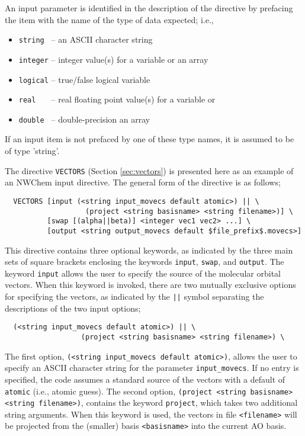 An input parameter is identified in the description of the directive
by prefacing the item with the name of the type of data expected;
i.e.,

\begin{itemize}
\item \verb+string +  -- an ASCII character string
\item \verb+integer+ --  integer value(s) for a variable or an array
\item \verb+logical+ --  true/false logical variable
\item \verb+real   +  -- real floating point value(s) for a variable or 
\item \verb+double + -- double-precision
an array
\end{itemize}

If an input item is not prefaced by one of these type names,
it is assumed to be of type 'string'.
 
The directive \verb+VECTORS+ (Section \ref{sec:vectors}) is presented here
as an example of an NWChem input directive.  The general form of the
directive is as follows;
\begin{verbatim}
  VECTORS [input (<string input_movecs default atomic>) || \
                   (project <string basisname> <string filename>)] \
          [swap [(alpha||beta)] <integer vec1 vec2> ...] \
          [output <string output_movecs default $file_prefix$.movecs>]
\end{verbatim}

This directive contains three optional keywords, as indicated by the 
three main sets of square brackets enclosing the keywords \verb+input+,
\verb+swap+, and \verb+output+.  The keyword \verb+input+ allows the
user to specify the source of the molecular orbital vectors.  When
this keyword is invoked, there are two mutually exclusive options for
specifying the vectors, as indicated by the \verb+||+ symbol
separating the descriptions of the two input options;

\begin{verbatim}
  (<string input_movecs default atomic>) || \
                  (project <string basisname> <string filename>) \
\end{verbatim}

The first option, \verb+(<string input_movecs default atomic>)+,
allows the user to specify an ASCII character string for the parameter
{\tt input\_movecs}.  If no entry is specified, the code assumes a
standard source of the vectors with a default of \verb+atomic+ (i.e.,
atomic guess).  The second option, {\tt(project <string basisname>
  <string filename>)}, contains the keyword \verb+project+, which
takes two additional string arguments.  When this keyword is used, the
vectors in file \verb+<filename>+ will be projected from the (smaller)
basis \verb+<basisname>+ into the current AO basis.

